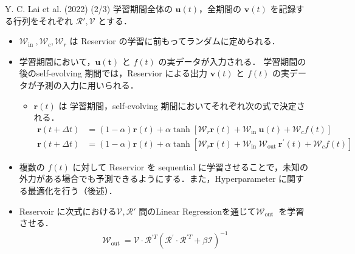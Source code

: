 \begin{frame}{Y. C. Lai et al. (2022) (2/3)}
    学習期間全体の $\mathbf{u}(t)$，全期間の $\mathbf{v}(t)$ を記録する行列をそれぞれ $\mathcal{R'}, \mathcal{V}$ とする．
    \begin{itemize}
        \item $\mathcal{W}_{\text {in }}, \mathcal{W}_c, \mathcal{W}_r$ は Reservior の学習に前もってランダムに定められる．
        \item 学習期間において，$\mathbf{u(t)}$ と $f(t)$ の実データが入力される．
        学習期間の後のself-evolving 期間では，Reservior による出力 $\mathbf{v}(t)$ と $f(t)$ の実データが予測の入力に用いられる．
        \begin{itemize}
            \item $\mathbf{r}(t)$ は 学習期間，self-evolving 期間においてそれぞれ次の式で決定される．
            \vspace{-.2cm}
            \begin{align}
                \mathbf{r}(t+\Delta t) & =(1-\alpha) \mathbf{r}(t) + \alpha \tanh \left[\mathcal{W}_r \mathbf{r}(t)+\mathcal{W}_{\text {in }} \mathbf{u}(t)+\mathcal{W}_c f(t)\right] \label{Lai_r1}\\
                \mathbf{r}(t+\Delta t) & =(1-\alpha) \mathbf{r}(t) + \alpha \tanh \left[\mathcal{W}_r \mathbf{r}(t)+\mathcal{W}_{\text {in }} \mathcal{W}_{\text {out }} \mathbf{r}^{\prime}(t)+\mathcal{W}_c f(t)\right]\label{Lai_r2}
            \end{align}
        \end{itemize}
        \item 複数の $f(t)$ に対して Reservior を sequential に学習させることで，未知の外力がある場合でも予測できるようにする．また，Hyperparameter に関する最適化を行う（後述）．
        \item Reservoir に次式における$\mathcal{V}, \mathcal{R'}$ 間のLinear Regressionを通じて$\mathcal{W}_{\text {out }}$ を学習させる．
        \vspace{-.2cm}
        \begin{align}
            \mathcal{W}_{\text {out }}=\mathcal{V} \cdot \mathcal{R}^{\prime T}\left(\mathcal{R}^{\prime} \cdot \mathcal{R}^{\prime T}+\beta \mathcal{I}\right)^{-1}
        \end{align}
    \end{itemize}

\end{frame}

